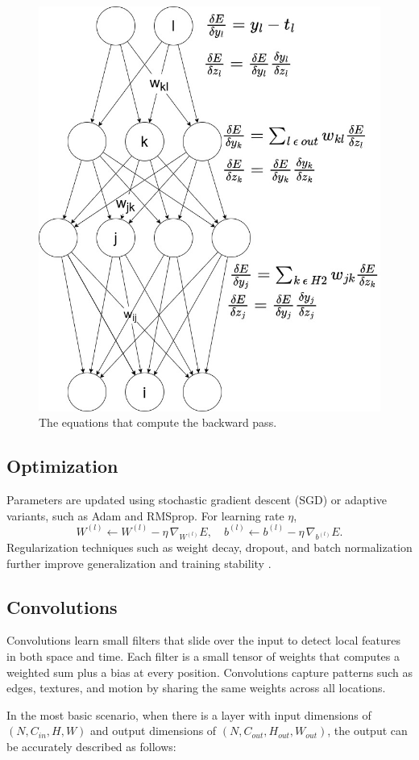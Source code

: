 \begin{figure}[ht]
    \centering
    \includegraphics[width=0.6\linewidth]{figures/neural_net_back_prop.jpg}
    \caption{The equations that compute the backward pass.}
    \label{fig:backward_pass}
\end{figure}

\subsection{Optimization}
Parameters are updated using stochastic gradient descent (SGD) or adaptive variants, such as Adam and RMSprop. For learning rate \(\eta\),
\[
W^{(l)} \leftarrow W^{(l)} - \eta\,\nabla_{W^{(l)}}E,
\quad
b^{(l)} \leftarrow b^{(l)} - \eta\,\nabla_{b^{(l)}}E.
\]
Regularization techniques such as weight decay, dropout, and batch normalization further improve generalization and training stability \cite{ioffe_batch_2015}.

\subsection{Convolutions}

Convolutions learn small filters that slide over the input to detect local features in both space and time. Each filter is a small tensor of weights that computes a weighted sum plus a bias at every position. Convolutions capture patterns such as edges, textures, and motion by sharing the same weights across all locations.  

In the most basic scenario, when there is a layer with input dimensions of \( (N, C_{in}, H, W)\) and output dimensions of \( (N, C_{out}, H_{out}, W_{out})\), the output can be accurately described as follows:

